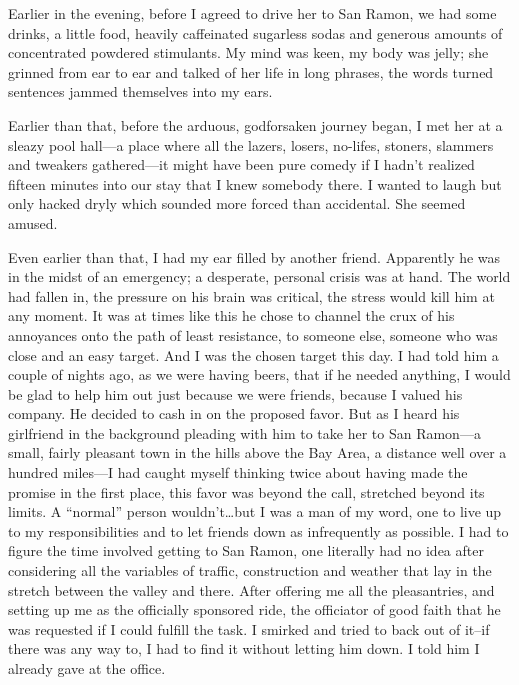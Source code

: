 \documentclass[
]{article}
\begin{document}
Earlier in the evening, before I agreed to drive her to San Ramon, we
had some drinks, a little food, heavily caffeinated sugarless sodas and
generous amounts of concentrated powdered stimulants. My mind was keen,
my body was jelly; she grinned from ear to ear and talked of her life in
long phrases, the words turned sentences jammed themselves into my ears.

Earlier than that, before the arduous, godforsaken journey began, I met
her at a sleazy pool hall---a place where all the lazers, losers,
no-lifes, stoners, slammers and tweakers gathered---it might have been
pure comedy if I hadn't realized fifteen minutes into our stay that I
knew somebody there. I wanted to laugh but only hacked dryly which
sounded more forced than accidental. She seemed amused.

Even earlier than that, I had my ear filled by another friend.
Apparently he was in the midst of an emergency; a desperate, personal
crisis was at hand. The world had fallen in, the pressure on his brain
was critical, the stress would kill him at any moment. It was at times
like this he chose to channel the crux of his annoyances onto the path
of least resistance, to someone else, someone who was close and an easy
target. And I was the chosen target this day. I had told him a couple of
nights ago, as we were having beers, that if he needed anything, I would
be glad to help him out just because we were friends, because I valued
his company. He decided to cash in on the proposed favor. But as I heard
his girlfriend in the background pleading with him to take her to San
Ramon---a small, fairly pleasant town in the hills above the Bay Area, a
distance well over a hundred miles---I had caught myself thinking twice
about having made the promise in the first place, this favor was beyond
the call, stretched beyond its limits. A ``normal'' person
wouldn't\ldots but I was a man of my word, one to live up to my
responsibilities and to let friends down as infrequently as possible. I
had to figure the time involved getting to San Ramon, one literally had
no idea after considering all the variables of traffic, construction and
weather that lay in the stretch between the valley and there. After
offering me all the pleasantries, and setting up me as the officially
sponsored ride, the officiator of good faith that he was requested if I
could fulfill the task. I smirked and tried to back out of it--if there
was any way to, I had to find it without letting him down. I told him I
already gave at the office.
\end{document}
